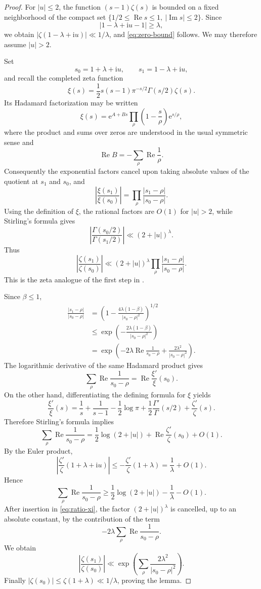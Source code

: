 \documentclass[12pt,reqno]{amsart}
\theoremstyle{remark}
\numberwithin{equation}{section}
\newcommand{\Ree}{\operatorname{Re}}
\newcommand{\Imm}{\operatorname{Im}}
\newcommand{\e}{\mathrm e}
\newcommand{\ii}{\mathrm i}
\begin{document}
\begin{proof}
For $|u|\le2$, the function $(s-1)\zeta(s)$ is bounded on a fixed neighborhood of the compact set $\{1/2\le\Ree s\le1,\ |\Imm s|\le2\}$.  Since
\[
|1-\lambda+\ii u-1|\ge\lambda,
\]
we obtain $|\zeta(1-\lambda+\ii u)|\ll1/\lambda$, and \eqref{eq:zero-bound} follows.  We may therefore assume $|u|>2$.

Set
\[
s_0=1+\lambda+\ii u,
\qquad
s_1=1-\lambda+\ii u,
\]
and recall the completed zeta function
\[
\xi(s)=\frac12s(s-1)\pi^{-s/2}\Gamma(s/2)\zeta(s).
\]
Its Hadamard factorization may be written
\[
\xi(s)=\e^{A+Bs}\prod_\rho
\left(1-\frac{s}{\rho}\right)\e^{s/\rho},
\]
where the product and sums over zeros are understood in the usual symmetric sense and
\[
\Ree B=-\sum_\rho\Ree\frac1\rho.
\]
Consequently the exponential factors cancel upon taking absolute values of the quotient at $s_1$ and $s_0$, and
\[
\left|\frac{\xi(s_1)}{\xi(s_0)}\right|
=
\prod_\rho\frac{|s_1-\rho|}{|s_0-\rho|}.
\]
Using the definition of $\xi$, the rational factors are $O(1)$ for $|u|>2$, while Stirling's formula gives
\[
\left|\frac{\Gamma(s_0/2)}{\Gamma(s_1/2)}\right|
\ll (2+|u|)^\lambda.
\]
Thus
\begin{equation}\label{eq:ratio-xi}
\left|\frac{\zeta(s_1)}{\zeta(s_0)}\right|
\ll
(2+|u|)^\lambda
\prod_\rho\frac{|s_1-\rho|}{|s_0-\rho|}.
\end{equation}
This is the zeta analogue of the first step in \cite[Lemma 3.1]{GS18}.

Since $\beta\le1$,
\begin{align*}
\frac{|s_1-\rho|}{|s_0-\rho|}
&=\left(1-\frac{4\lambda(1-\beta)}{|s_0-\rho|^2}\right)^{1/2}\\
&\le
\exp\!\left(-\frac{2\lambda(1-\beta)}{|s_0-\rho|^2}\right)\\
&=
\exp\!\left(
-2\lambda\Ree\frac1{s_0-\rho}
+\frac{2\lambda^2}{|s_0-\rho|^2}
\right).
\end{align*}
The logarithmic derivative of the same Hadamard product gives
\[
\sum_\rho\Ree\frac1{s_0-\rho}=\Ree\frac{\xi'}{\xi}(s_0).
\]
On the other hand, differentiating the defining formula for $\xi$ yields
\[
\frac{\xi'}{\xi}(s)
=
\frac1s+\frac1{s-1}-\frac12\log\pi
+\frac12\frac{\Gamma'}{\Gamma}(s/2)
+\frac{\zeta'}{\zeta}(s).
\]
Therefore Stirling's formula implies
\begin{equation}\label{eq:logder-lower}
\sum_\rho\Ree\frac1{s_0-\rho}
=\frac12\log(2+|u|)+\Ree\frac{\zeta'}{\zeta}(s_0)+O(1).
\end{equation}
By the Euler product,
\[
\left|\frac{\zeta'}{\zeta}(1+\lambda+\ii u)\right|
\le -\frac{\zeta'}{\zeta}(1+\lambda)
=\frac1\lambda+O(1).
\]
Hence
\[
\sum_\rho\Ree\frac1{s_0-\rho}
\ge\frac12\log(2+|u|)-\frac1\lambda-O(1).
\]
After insertion in \eqref{eq:ratio-xi}, the factor $(2+|u|)^\lambda$ is cancelled, up to an absolute constant, by the contribution of the term
\[
-2\lambda\sum_\rho\Ree\frac1{s_0-\rho}.
\]
We obtain
\[
\left|\frac{\zeta(s_1)}{\zeta(s_0)}\right|
\ll
\exp\!\left(
\sum_\rho\frac{2\lambda^2}{|s_0-\rho|^2}
\right).
\]
Finally $|\zeta(s_0)|\le\zeta(1+\lambda)\ll1/\lambda$, proving the lemma.
\end{proof}
\end{document}
